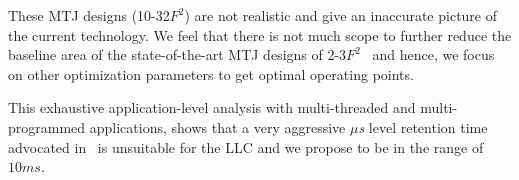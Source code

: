 These MTJ designs (10-32$F^2$) are not realistic and give an inaccurate picture of the current technology. We feel that there is not much scope to
further reduce the baseline area of the state-of-the-art MTJ designs of 2-3$F^2$~\cite{STTRAM:Grandis11} and hence, we focus on other optimization parameters to get optimal operating points. 



This exhaustive application-level analysis 
with multi-threaded and multi-programmed applications, shows that a very aggressive {\it $\mu$s} 
level retention time advocated in~\cite{STTRAM:HPCA11} is unsuitable for the LLC and
we propose to be in the range of $10ms$. 